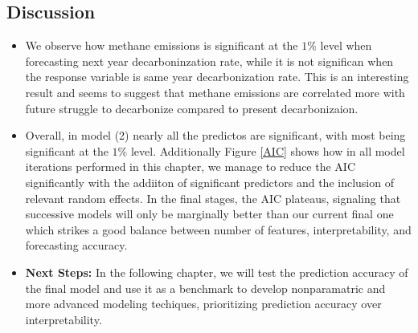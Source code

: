 \subsection{Discussion}

\begin{itemize}
    \item We observe how methane emissions is significant at the $1\%$ level when forecasting next year decarboninzation rate, while it is not significan when the response variable is same year decarbonization rate. This is an interesting result and seems to suggest that methane emissions are correlated more with future struggle to decarbonize compared to present decarbonizaion. 
    \item Overall, in model (2) nearly all the predictos are significant, with most being significant at the $1\%$ level. Additionally Figure \ref{AIC} shows how in all model iterations performed in this chapter, we manage to reduce the AIC significantly with the addiiton of significant predictors and the inclusion of relevant random effects. In the final stages, the AIC plateaus, signaling that successive models will only be marginally better than our current final one which strikes a good balance between number of features, interpretability, and forecasting accuracy.
    \item \textbf{Next Steps:} In the following chapter, we will test the prediction accuracy of the final model and use it as a benchmark to develop nonparamatric and more advanced modeling techiques, prioritizing prediction accuracy over interpretability.
\end{itemize}
